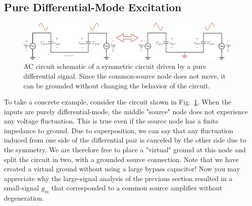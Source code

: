 \subsection{Pure Differential-Mode Excitation}
\begin{figure}[tb]
\centering
\includegraphics[width=\columnwidth]{DM_model.pdf}
\caption{AC circuit schematic of a symmetric circuit driven by a pure differential signal.  Since the common-source node does not move, it can be grounded without changing the behavior of the circuit.} \label{fig:DM_model.pdf}
\end{figure}
To take a concrete example, consider the circuit shown in Fig.~\ref{fig:DM_model.pdf}. When the inputs are purely differential-mode, the middle "source" node does not experience any voltage fluctuation.  This is true even if the source node has a finite impedance to ground.  Due to superposition, we can say that any fluctuation induced from one side of the differential pair is canceled by the other side due to the symmetry. We are therefore free to place a "virtual" ground at this node and split the circuit in two, with a grounded source connection.  Note that we have created a virtual ground without using a large bypass capacitor!  Now you may appreciate why the large-signal analysis of the previous section resulted in a small-signal $g_m$ that corresponded to a common source amplifier without degeneration. 
